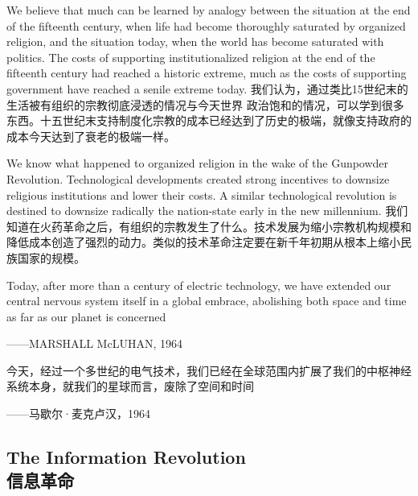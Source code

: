 \begin{paracol}{2}[]
We believe that much can be learned by analogy between the situation at the end of the fifteenth century, when life had become thoroughly saturated by organized religion, and the situation today, when the world has become saturated with politics. The costs of supporting institutionalized religion at the end of the fifteenth century had reached a historic extreme, much as the costs of supporting government have reached a senile extreme today.
\switchcolumn
我们认为，通过类比15世纪末的生活被有组织的宗教彻底浸透的情况与今天世界 政治饱和的情况，可以学到很多东西。十五世纪末支持制度化宗教的成本已经达到了历史的极端，就像支持政府的成本今天达到了衰老的极端一样。
\end{paracol}

\begin{paracol}{2}[]
We know what happened to organized religion in the wake of the Gunpowder Revolution. Technological developments created strong incentives to downsize religious institutions and lower their costs. A similar technological revolution is destined to downsize radically the nation-state early in the new millennium.
\switchcolumn
我们知道在火药革命之后，有组织的宗教发生了什么。技术发展为缩小宗教机构规模和降低成本创造了强烈的动力。类似的技术革命注定要在新千年初期从根本上缩小民族国家的规模。
\end{paracol}

\begin{paracol}{2}[]
\begin{tcolorbox}
Today, after more than a century of electric technology, we have extended our central nervous system itself in a global embrace, abolishing both space and time as far as our planet is concerned
\begin{flushright}
——MARSHALL McLUHAN, 1964
\end{flushright}
\end{tcolorbox}
\switchcolumn
\begin{tcolorbox}
今天，经过一个多世纪的电气技术，我们已经在全球范围内扩展了我们的中枢神经系统本身，就我们的星球而言，废除了空间和时间
\begin{flushright}
——马歇尔·麦克卢汉，1964
\end{flushright}
\end{tcolorbox}
\end{paracol}


\subsection[信息革命]{The Information Revolution \\信息革命}

